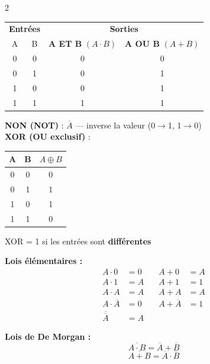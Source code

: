 \documentclass[a4paper,10pt]{article}
\begin{document}
\begin{multicols}{2}
\begin{tcolorbox}[basebox, colframe=purple, title=3. Algèbre Booléenne — Opérateurs]
\begin{center}
\begin{tabular}{cccc}
\toprule
\multicolumn{2}{c}{\textbf{Entrées}} & \multicolumn{2}{c}{\textbf{Sorties}} \\
A & B & \textbf{A ET B} $(A \cdot B)$ & \textbf{A OU B} $(A+B)$ \\
\midrule
0 & 0 & 0 & 0 \\
0 & 1 & 0 & 1 \\
1 & 0 & 0 & 1 \\
1 & 1 & 1 & 1 \\
\bottomrule
\end{tabular}
\end{center}
\vspace{4pt}
\textbf{NON (NOT)} : $\overline{A}$ — inverse la valeur (0$\to$1, 1$\to$0)\\[4pt]
\textbf{XOR (OU exclusif)} :
\begin{center}
\begin{tabular}{ccc}
A & B & $A \oplus B$ \\
\hline
0 & 0 & 0 \\
0 & 1 & 1 \\
1 & 0 & 1 \\
1 & 1 & 0 \\
\end{tabular}
\end{center}
XOR = 1 si les entrées sont \textbf{différentes}
\end{tcolorbox}

\begin{tcolorbox}[basebox, colframe=purple, title=4. Algèbre Booléenne — Propriétés et lois]
\textbf{Lois élémentaires :}
\begin{align*}
A \cdot 0 &= 0 \quad & A + 0 &= A \\
A \cdot 1 &= A \quad & A + 1 &= 1 \\
A \cdot A &= A \quad & A + A &= A \\
A \cdot \overline{A} &= 0 \quad & A + \overline{A} &= 1 \\
\overline{\overline{A}} &= A &&
\end{align*}

\textbf{Lois de De Morgan :}
\[
\overline{A \cdot B} = \overline{A} + \overline{B}
\]
\[
\overline{A + B} = \overline{A} \cdot \overline{B}
\]


\end{tcolorbox}
\end{multicols}
\end{document}

